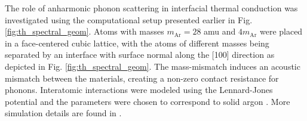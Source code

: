 The role of anharmonic phonon scattering in interfacial thermal conduction was investigated using the computational setup presented earlier in Fig. \ref{fig:th_spectral_geom}. Atoms with masses $m_{\textrm{Ar}}=28$ amu and $4m_{\textrm{Ar}}$ were placed in a face-centered cubic lattice, with the atoms of different masses being separated by an interface with surface normal along the [100] direction as depicted in Fig. \ref{fig:th_spectral_geom}. The mass-mismatch induces an acoustic mismatch between the materials, creating a non-zero contact resistance for phonons. Interatomic interactions were modeled using the Lennard-Jones potential \cite{allentildesley} and the parameters were chosen to correspond to solid argon \cite{allentildesley}. More simulation details are found in . %

